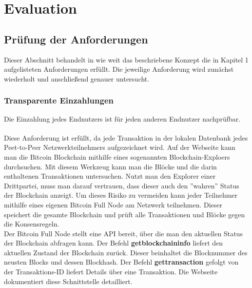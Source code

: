 \section{Evaluation}
\subsection{Prüfung der Anforderungen}%

Dieser Abschnitt behandelt in wie weit das beschriebene Konzept die in Kapitel 1 aufgelisteten Anforderungen erfüllt. Die jeweilige Anforderung wird zunächst wiederholt und anschließend genauer untersucht.

\subsubsection{Transparente Einzahlungen}
Die Einzahlung jedes Endnutzers ist für jeden anderen Endnutzer nachprüfbar.\\\\
Diese Anforderung ist erfüllt, da jede Transaktion in der lokalen Datenbank jedes Peet-to-Peer Netzwerkteilnehmers aufgezeichnet wird. 
Auf der Webseite \cite{blockchain_info} kann man die Bitcoin Blockchain mithilfe eines sogenannten Blockchain-Exploers durchsuchen. Mit diesem Werkzeug kann man die Blöcke und die darin enthaltenen Transaktionen untersuchen. Nutzt man den Explorer einer Drittpartei, muss man darauf vertrauen, dass dieser auch den ''wahren'' Status der Blockchain anzeigt. Um dieses Risiko zu vermeiden kann jeder Teilnehmer mithilfe eines eigenen Bitcoin Full Node am Netzwerk teilnehmen. Dieser speichert die gesamte Blockchain und prüft alle Transaktionen und Blöcke gegen die Konsensregeln.\\
Der Bitcoin Full Node stellt eine API bereit, über die man den aktuellen Status der Blockchain abfragen kann. Der Befehl \textbf{getblockchaininfo} liefert den aktuellen Zustand der Blockchain zurück. Dieser beinhaltet die Blocknummer des neusten Blocks und dessen Blockhash. Der Befehl \textbf{gettransaction} gefolgt von der Transaktions-ID liefert Details über eine Transaktion. Die Webseite \cite{btc_api} dokumentiert diese Schnittstelle detailliert. 

